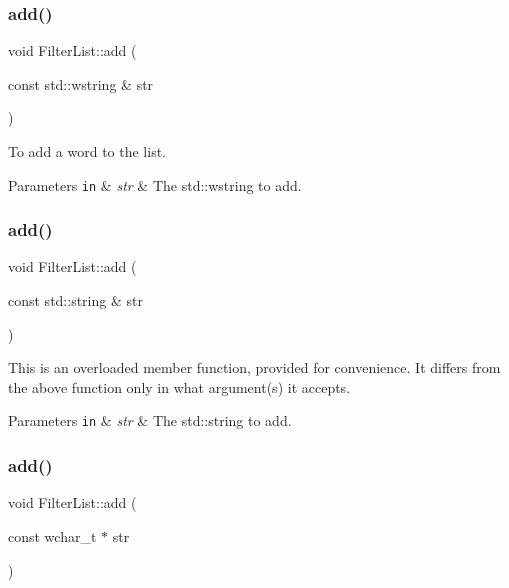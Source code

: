 \subsubsection{\texorpdfstring{add()}{add()}\hspace{0.1cm}{\footnotesize\ttfamily [1/8]}}
{\footnotesize\ttfamily void Filter\+List\+::add (\begin{DoxyParamCaption}\item[{const std\+::wstring \&}]{str }\end{DoxyParamCaption})}



To add a word to the list. 


\begin{DoxyParams}[1]{Parameters}
\mbox{\tt in}  & {\em str} & The std\+::wstring to add. \\
\hline
\end{DoxyParams}
\mbox{\label{classlakoo_1_1_filter_list_aa5a478b5f4bdd0b887a30033f2de9005}} 
\subsubsection{\texorpdfstring{add()}{add()}\hspace{0.1cm}{\footnotesize\ttfamily [2/8]}}
{\footnotesize\ttfamily void Filter\+List\+::add (\begin{DoxyParamCaption}\item[{const std\+::string \&}]{str }\end{DoxyParamCaption})}

This is an overloaded member function, provided for convenience. It differs from the above function only in what argument(s) it accepts. 
\begin{DoxyParams}[1]{Parameters}
\mbox{\tt in}  & {\em str} & The std\+::string to add. \\
\hline
\end{DoxyParams}
\mbox{\label{classlakoo_1_1_filter_list_afa7823ad250d1d8b413f6b8e03628ab1}} 
\subsubsection{\texorpdfstring{add()}{add()}\hspace{0.1cm}{\footnotesize\ttfamily [3/8]}}
{\footnotesize\ttfamily void Filter\+List\+::add (\begin{DoxyParamCaption}\item[{const wchar\+\_\+t $\ast$}]{str }\end{DoxyParamCaption})}

